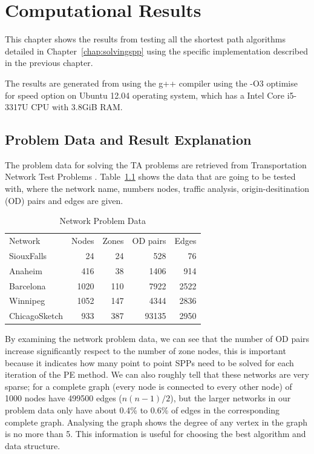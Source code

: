 \chapter{Computational Results}\label{chap:results}

This chapter shows the results from testing all the shortest path algorithms detailed in Chapter~\ref{chap:solvingspp} using the specific implementation described in the previous chapter.

The results are generated from using the g++ compiler using the -O3 optimise for speed option on Ubuntu 12.04 operating system, which has a Intel Core i5-3317U CPU with 3.8GiB RAM.

\section{Problem Data and Result Explanation}
The problem data for solving the TA problems are retrieved from Transportation Network Test Problems \citep{ProblemData}.
Table~\ref{table:problemdata} shows the data that are going to be tested with,
where the network name, numbers nodes, traffic analysis, origin-desitination (OD) pairs and edges are given.
\begin{table}[H]
    \centering
    \begin{tabular}{lrrrr} \toprule
        Network & Nodes & Zones & OD pairs & Edges \\ \cmidrule(lr){1-5}
        SiouxFalls    & 24   & 24  & 528   & 76   \\
        Anaheim       & 416  & 38  & 1406  & 914  \\
        Barcelona     & 1020 & 110 & 7922  & 2522 \\
        Winnipeg      & 1052 & 147 & 4344  & 2836 \\
        ChicagoSketch & 933  & 387 & 93135 & 2950 \\ \bottomrule
    \end{tabular}
    \caption{Network Problem Data}
    \label{table:problemdata}
\end{table}
By examining the network problem data,
we can see that the number of OD pairs increase
significantly respect to the number of zone nodes,
this is important because it indicates how many point to point SPPs need to be solved for each iteration of the PE method.
We can also roughly tell that these networks are very sparse;
for a complete graph (every node is connected to every other node) of 1000 nodes have 499500 edges ($n(n-1)/2$),
but the larger networks in our problem data only have about 0.4\% to 0.6\% of edges in the corresponding complete graph. 
Analysing the graph shows the degree of any vertex in the graph is no more than 5.
This information is useful
for choosing the best algorithm and data structure.

